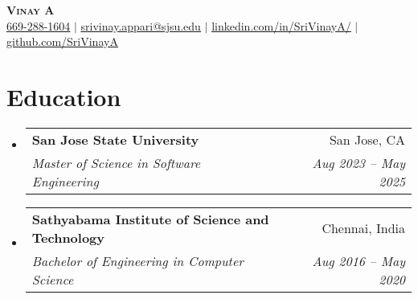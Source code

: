 \documentclass{article}
\makeatletter
\newcommand{\resumeSubheading}[4]{
  \vspace{-2pt}\item
    \begin{tabular*}{0.97\textwidth}[t]{l@{\extracolsep{\fill}}r}
      \textbf{#1} & #2 \\
      \textit{\small#3} & \textit{\small #4} \\
    \end{tabular*}\vspace{-7pt}
}
\newcommand{\resumeSubHeadingListStart}{\begin{itemize}[leftmargin=0.15in, label={}]}
\newcommand{\resumeSubHeadingListEnd}{\end{itemize}}
\makeatother
\begin{document}
\begin{center}
\textbf{\Huge \scshape Vinay A} \\ \vspace{1pt}
\small \href{tel:6692881604}{669-288-1604} $|$ \href{mailto:srivinay.appari@sjsu.edu}{\underline{srivinay.appari@sjsu.edu}} $|$ \href{https://linkedin.com/in/SriVinayA/}{\underline{linkedin.com/in/SriVinayA/}} $|$ \href{https://github.com/SriVinayA}{\underline{github.com/SriVinayA}}
\end{center}


\section{Education}
\resumeSubHeadingListStart
\resumeSubheading
{San Jose State University}{San Jose, CA}
{Master of Science in Software Engineering}{Aug 2023 – May 2025}
\resumeSubheading
{Sathyabama Institute of Science and Technology}{Chennai, India}
{Bachelor of Engineering in Computer Science}{Aug 2016 – May 2020}
\resumeSubHeadingListEnd



\end{document}
